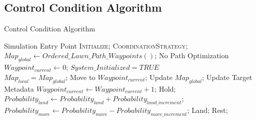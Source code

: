 \documentclass{report}
\begin{document}
\begin{appendices}
\chapter{Control Condition Algorithm}
\begin{algorithm}
	\caption{Control Condition Algorithm}
	\label{alg:con_algo}
	\begin{algorithmic}[1]
		 {} \Comment Simulation Entry Point
				\State \textsc{Initialize};
				\State \textsc{CoordinationStrategy};
			\EndWhile
		\EndProcedure
		\\
				\State $Map_{global} \gets Ordered\_Lawn\_Path\_Waypoints()$; \Comment No Path Optimization
				\State $Waypoint_{current} \gets 0$;
				\State $System\_Initialized = TRUE$
			\EndIf
		\EndProcedure
		\\
			\State $Map_{local} = Map_{global}$;
				\State Move to $Waypoint_{current}$;
						\State Update $Map_{global}$; \Comment Update Target Metadata
						\State $Waypoint_{current} \gets Waypoint_{current} + 1$;
					\Else
						\State Hold;
					\EndIf
					\State $Probability_{land} \gets Probability_{land} + Probability_{land\_increment}$;
					\State $Probability_{move} \gets Probability_{move} - Probability_{move\_increment}$;
				\EndIf
				\State Land;
			\Else
				\State Rest;
			\EndIf
		\EndProcedure
	\end{algorithmic}
\end{algorithm}


\end{appendices}
\end{document}
